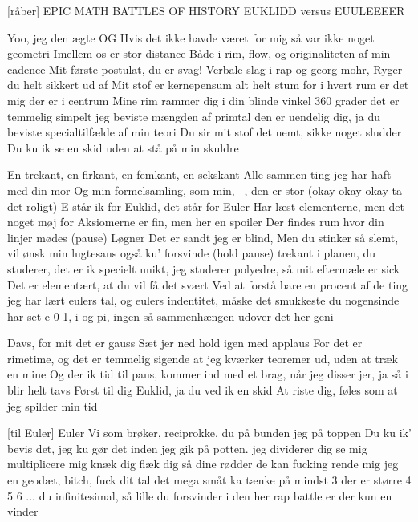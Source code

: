 \documentclass[a4paper,11pt]{article}
\begin{document}
\begin{song}
  [råber] EPIC MATH BATTLES OF HISTORY
  EUKLIDD versus EUULEEEER

   Yoo, jeg den ægte OG
  Hvis det ikke havde været for mig så var ikke noget geometri
  Imellem os er stor distance
  Både i rim, flow, og originaliteten af min cadence
  Mit første postulat, du er svag! Verbale slag
  i rap og georg mohr,
  Ryger du helt sikkert ud af
  Mit stof er kernepensum
  alt helt stum
  for i hvert rum
  er det mig der er i centrum
  Mine rim rammer dig i din blinde vinkel
  360 grader det er temmelig simpelt
  jeg beviste mængden af primtal den er uendelig
  dig, ja du beviste specialtilfælde af min teori
  Du sir mit stof det nemt, sikke noget sludder
  Du ku ik se en skid uden at stå på min skuldre

   En trekant, en firkant, en femkant, en sekskant
  Alle sammen ting jeg har haft med din mor
  Og min formelsamling, som min, --, den er stor
  (okay okay okay ta det roligt)
  E står ik for Euklid, det står for Euler
  Har læst elementerne, men det noget møj for
  Aksiomerne er fin, men her en spoiler
  Der findes rum hvor din linjer mødes (pause)
  Løgner
  Det er sandt jeg er blind,
  Men du stinker så slemt, vil ønsk min lugtesans også ku' forsvinde (hold pause)
  trekant i planen, du studerer, det er ik specielt unikt,
  jeg studerer polyedre, så mit eftermæle er sick
  Det er elementært, at du vil få det svært
  Ved at forstå bare en procent af de ting jeg har lært
  eulers tal, og eulers indentitet, 
  måske det smukkeste du nogensinde har set
  e 0 1, i og pi,
  ingen så sammenhængen udover det her geni
  

   Davs, for mit det er gauss
  Sæt jer ned hold igen med applaus
  For det er rimetime, og det er temmelig sigende
  at jeg kværker teoremer ud, uden at træk en mine
  Og der ik tid til paus, kommer ind med et brag,
  når jeg disser jer, ja så i blir helt tavs
  Først til dig Euklid, ja du ved ik en skid
  At riste dig, føles som at jeg spilder min tid

  [til Euler] Euler
  Vi som brøker, reciprokke, du på bunden jeg på toppen
  Du ku ik' bevis det, jeg ku gør det inden jeg gik på potten.
  jeg dividerer dig se mig multiplicere mig knæk dig flæk dig
  så dine rødder de kan fucking rende mig
  jeg en geodæt, bitch, fuck dit tal det mega småt
  ka tænke på mindst 3 der er større 4 5 6 ...
  du infinitesimal, så lille du forsvinder
  i den her rap battle er der kun en vinder
\end{song}

\end{document}
